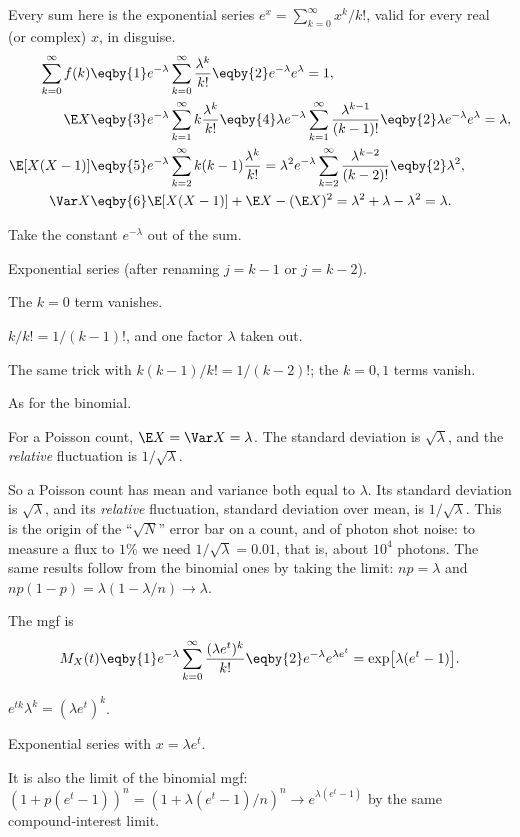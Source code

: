 Every sum here is the exponential series $e^{x}=\sum_{k=0}^\infty x^k/k!$, valid for every real (or complex) $x$, in disguise.
\begin{align*}
  \sum_{k=0}^\infty f(k) &\eqby{1} e^{-\lambda}\sum_{k=0}^\infty\frac{\lambda^k}{k!} \eqby{2} e^{-\lambda}e^{\lambda}=1,\\
  \E X &\eqby{3} e^{-\lambda}\sum_{k=1}^\infty k\frac{\lambda^k}{k!}
       \eqby{4} \lambda e^{-\lambda}\sum_{k=1}^\infty\frac{\lambda^{k-1}}{(k-1)!}
       \eqby{2} \lambda e^{-\lambda}e^{\lambda}=\lambda,\\
  \E[X(X-1)] &\eqby{5} e^{-\lambda}\sum_{k=2}^\infty k(k-1)\frac{\lambda^k}{k!}
       = \lambda^2 e^{-\lambda}\sum_{k=2}^\infty\frac{\lambda^{k-2}}{(k-2)!} \eqby{2} \lambda^2,\\
  \Var X &\eqby{6} \E[X(X-1)]+\E X-(\E X)^2 = \lambda^2+\lambda-\lambda^2=\lambda .
\end{align*}
\begin{explain}
  \item Take the constant $e^{-\lambda}$ out of the sum.
  \item Exponential series (after renaming $j=k-1$ or $j=k-2$).
  \item The $k=0$ term vanishes.
  \item $k/k!=1/(k-1)!$, and one factor $\lambda$ taken out.
  \item The same trick with $k(k-1)/k!=1/(k-2)!$; the $k=0,1$ terms vanish.
  \item As for the binomial.
\end{explain}
\begin{keyidea}
For a Poisson count, $\E X=\Var X=\lambda$. The standard deviation is $\sqrt\lambda$, and the \emph{relative} fluctuation is $1/\sqrt\lambda$.
\end{keyidea}
So a Poisson count has mean and variance both equal to $\lambda$. Its standard deviation is $\sqrt\lambda$, and its \emph{relative} fluctuation, standard deviation over mean, is $1/\sqrt\lambda$. This is the origin of the ``$\sqrt N$'' error bar on a count, and of photon shot noise: to measure a flux to $1\%$ we need $1/\sqrt\lambda=0.01$, that is, about $10^4$ photons. The same results follow from the binomial ones by taking the limit: $np=\lambda$ and $np(1-p)=\lambda(1-\lambda/n)\to\lambda$.

The mgf is
\begin{align}
  M_X(t) \eqby{1} e^{-\lambda}\sum_{k=0}^\infty\frac{(\lambda e^t)^k}{k!} \eqby{2} e^{-\lambda}e^{\lambda e^t}=\exp\bigl[\lambda(e^t-1)\bigr]. \label{2a:eq:poismgf}
\end{align}
\begin{explain}
  \item $e^{tk}\lambda^k=(\lambda e^t)^k$.
  \item Exponential series with $x=\lambda e^t$.
\end{explain}
It is also the limit of the binomial mgf: $(1+p(e^t-1))^n=(1+\lambda(e^t-1)/n)^n\to e^{\lambda(e^t-1)}$ by the same compound-interest limit.

